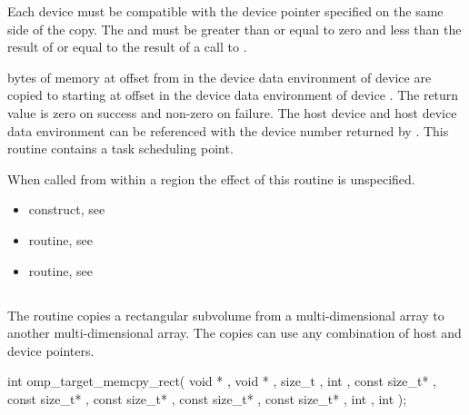 \constraints
Each device must
be compatible with the device pointer specified on the same side of the copy.
The  and 
must be greater than or equal to zero and less than the result of
 or equal to the result of a call to
.

\effect


 bytes of memory at offset  from  
in the device data environment of device  are
copied to  starting at offset  in the device data
environment of device .  
The return value is zero on success and non-zero on failure.  The host device
and host device data environment can be referenced with the device number
returned by . This routine contains a task
scheduling point.

When called from within a  region 
the effect of this routine is unspecified.

\crossreferences
\begin{itemize}
\item {} construct, see 

\item {} routine, see 

\item {} routine, see 
\end{itemize}


\pagebreak
{}
\vspace{-1\baselineskip}
\subsection{}
\label{subsec:omp_target_memcpy_rect}
\summary

The  routine copies a rectangular subvolume from
a multi-dimensional array to another multi-dimensional array. The copies can
use any combination of host and device pointers.

\format
\begin{samepage}
\begin{boxedcode}
int omp\_target\_memcpy\_rect(
               void * , void * ,
               size\_t ,
               int ,
               const size\_t* ,
               const size\_t* ,
               const size\_t* ,
               const size\_t* ,
               const size\_t* ,
               int , int );
\end{boxedcode}
\end{samepage}

